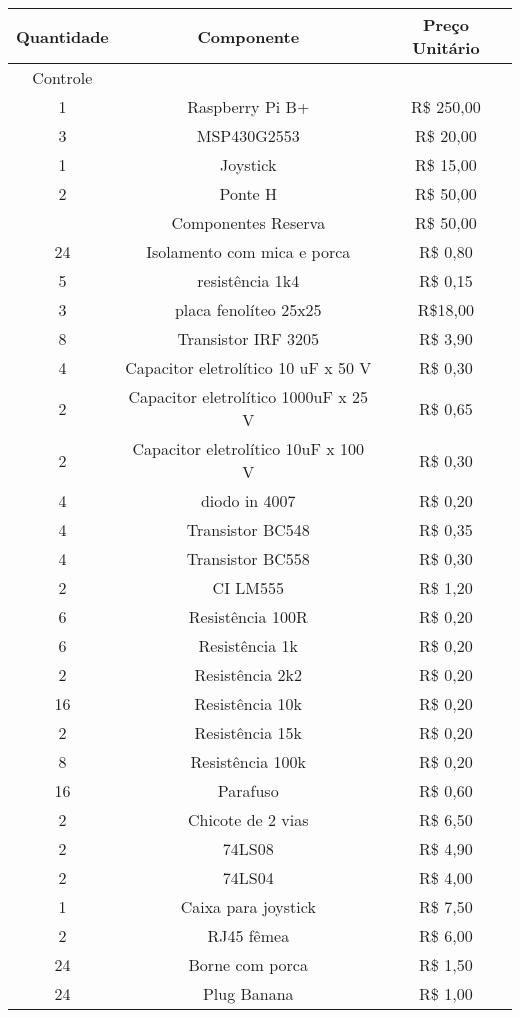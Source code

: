 \begin{longtable}{|c|c|c|}
\hline
Quantidade & Componente & Preço Unitário \\ \hline
Controle &  &  \\
1 & Raspberry Pi B+ & R\$ 250,00 \\
3 & MSP430G2553 & R\$ 20,00 \\
1 & Joystick & R\$ 15,00 \\
2 & Ponte H & R\$ 50,00 \\
  & Componentes Reserva & R\$ 50,00 \\
24 & Isolamento com mica e porca & R\$ 0,80 \\
5 & resistência 1k4 & R\$ 0,15 \\
3 & placa fenolíteo 25x25 & R\$18,00 \\
8 & Transistor IRF 3205 & R\$ 3,90 \\
4 & Capacitor eletrolítico 10 uF x 50 V & R\$ 0,30 \\
2 & Capacitor eletrolítico 1000uF x 25 V & R\$ 0,65 \\
2 & Capacitor eletrolítico 10uF x 100 V & R\$ 0,30 \\
4 & diodo in 4007 & R\$ 0,20 \\
4 & Transistor BC548 & R\$ 0,35 \\
4 & Transistor BC558 & R\$ 0,30 \\
2 & CI LM555 & R\$ 1,20 \\
6 & Resistência 100R & R\$ 0,20 \\
6 & Resistência 1k & R\$ 0,20 \\
2 & Resistência 2k2 & R\$ 0,20 \\
16 & Resistência 10k & R\$ 0,20 \\
2 & Resistência 15k & R\$ 0,20 \\
8 & Resistência 100k & R\$ 0,20 \\
16 & Parafuso & R\$ 0,60 \\
2 & Chicote de 2 vias & R\$ 6,50 \\
2 & 74LS08 & R\$ 4,90 \\
2 & 74LS04 & R\$ 4,00 \\
1 & Caixa para joystick & R\$ 7,50 \\
2 & RJ45 fêmea & R\$ 6,00 \\
24 & Borne com porca & R\$ 1,50 \\
24 & Plug Banana & R\$ 1,00 \\

\end{longtable}
